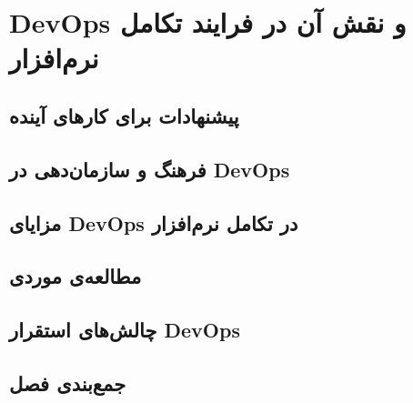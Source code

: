 \chapter{DevOps و نقش آن در فرایند تکامل نرم‌افزار}
\label{ch:conclusion}





\section{پیشنهادات برای کارهای آینده}
\label{sec:ch4-future}



\section{فرهنگ و سازمان‌دهی در DevOps}
\label{sec:ch3-5-culture}



\section{مزایای DevOps در تکامل نرم‌افزار}
\label{sec:ch3-6-benefits}


\section{مطالعه‌ی موردی}
\label{sec:ch3-7-case-study}


\section{چالش‌های استقرار DevOps}
\label{sec:ch3-8-challenges}


\section{جمع‌بندی فصل}
\label{sec:ch3-9-summary}

